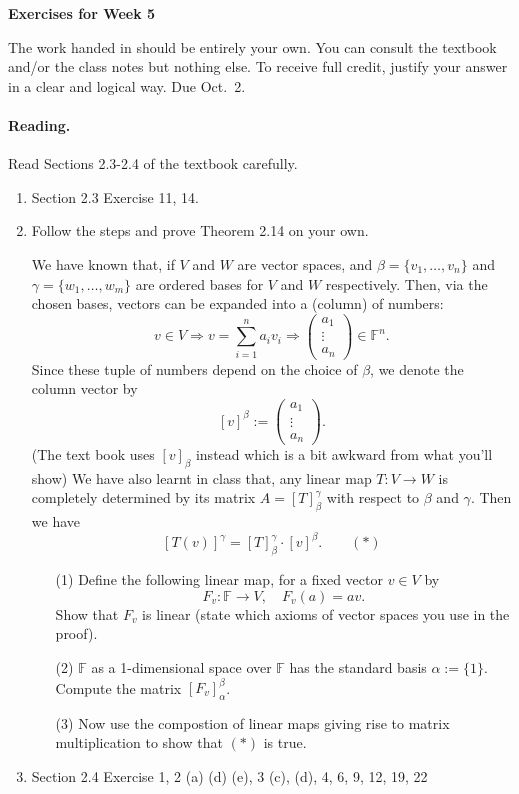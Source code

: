 \documentclass[11pt]{article}
\theoremstyle{plain}
\theoremstyle{definition}
\def\F{\mathbb F}
\def\lra{\longrightarrow}
\begin{document}
\begin{center}
{\Large \bf Exercises for Week 5}
\end{center}
The work handed in should be entirely your own. You can consult the textbook and/or the class notes but nothing else. To receive full credit, justify your answer in a clear and logical way. Due Oct.~2.

\paragraph{Reading.} Read Sections 2.3-2.4 of the textbook carefully.

\begin{enumerate}
\item Section 2.3 Exercise 11, 14. %
\item Follow the steps and prove Theorem 2.14 on your own.

We have known that, if $V$ and $ W$ are vector spaces, and $\beta=\{v_1,\dots, v_n\}$ and $\gamma=\{w_1,\dots, w_m\}$ are ordered bases for $V$ and $W$ respectively. Then, via the chosen bases, vectors can be expanded into a (column) of numbers:
\[
v\in V \Rightarrow v=\sum_{i=1}^n a_i v_i \Rightarrow 
\left(
\begin{matrix}
a_1\\
\vdots\\
a_n
\end{matrix}
\right)\in \F^n.
\] 
Since these tuple of numbers depend on the choice of $\beta$, we denote the column vector by
\[
[v]^{\beta}:=
\left(
\begin{matrix}
a_1\\
\vdots\\
a_n
\end{matrix}
\right).
\]
(The text book uses $[v]_{\beta}$ instead which is a bit awkward from what you'll show)
We have also learnt in class that, any linear map $T:V\lra W$ is completely determined by its matrix $A=[T]_\beta^\gamma$ with respect to $\beta$ and $\gamma$. Then we have
\[
[T(v)]^{\gamma}=[T]_{\beta}^{\gamma}\cdot [v]^{\beta}. \quad \quad (*)
\]
\begin{enumerate}
\item[(1)] Define the following linear map, for a fixed vector $v\in V$ by
\[
F_v: \F \lra V,\quad F_v(a)=av.
\]
Show that $F_v$ is linear (state which axioms of vector spaces you use in the proof).
\item[(2)] $\F$ as a 1-dimensional space over $\F$ has the standard basis $\alpha:=\{1\}$. Compute the matrix $[F_v]_{\alpha}^\beta$.
\item[(3)] Now use the compostion of linear maps giving rise to matrix multiplication to show that $(*)$ is true.
\end{enumerate}


\item Section 2.4 Exercise 1, 2 (a) (d) (e), 3 (c), (d), 4, 6, 9, 12, 19, 22 
\end{enumerate}
\end{document}
